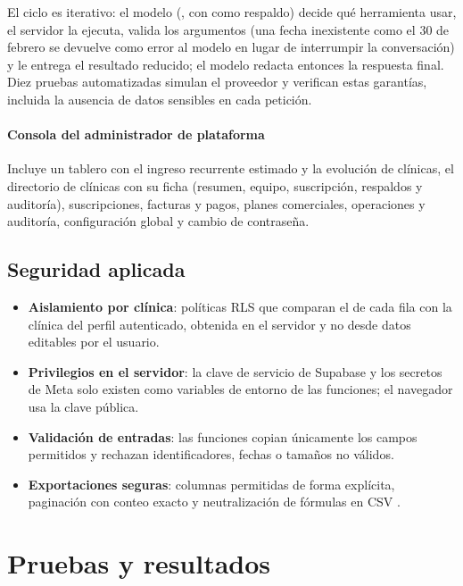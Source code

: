 \documentclass[11pt]{article}
\begin{document}
El ciclo es iterativo: el modelo (, con  como respaldo) decide qué herramienta usar, el servidor la ejecuta, valida los argumentos (una fecha inexistente como el 30 de febrero se devuelve como error al modelo en lugar de interrumpir la conversación) y le entrega el resultado reducido; el modelo redacta entonces la respuesta final. Diez pruebas automatizadas simulan el proveedor y verifican estas garantías, incluida la ausencia de datos sensibles en cada petición.

\paragraph{Consola del administrador de plataforma} Incluye un tablero con el ingreso recurrente estimado y la evolución de clínicas, el directorio de clínicas con su ficha (resumen, equipo, suscripción, respaldos y auditoría), suscripciones, facturas y pagos, planes comerciales, operaciones y auditoría, configuración global y cambio de contraseña.


\subsection{Seguridad aplicada}

\begin{itemize}
  \item \textbf{Aislamiento por clínica}: políticas RLS que comparan el  de cada fila con la clínica del perfil autenticado, obtenida en el servidor y no desde datos editables por el usuario.
  \item \textbf{Privilegios en el servidor}: la clave de servicio de Supabase y los secretos de Meta solo existen como variables de entorno de las funciones; el navegador usa la clave pública.
  \item \textbf{Validación de entradas}: las funciones copian únicamente los campos permitidos y rechazan identificadores, fechas o tamaños no válidos.
  \item \textbf{Exportaciones seguras}: columnas permitidas de forma explícita, paginación con conteo exacto y neutralización de fórmulas en CSV \parencite{owasp2021}.
\end{itemize}

\section{Pruebas y resultados}
\end{document}
